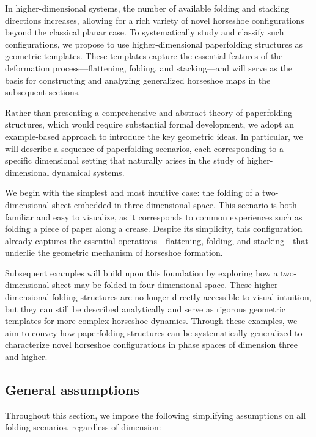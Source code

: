 \documentclass[12pt]{iopart}
\begin{document}
In higher-dimensional systems, the number of available folding and stacking directions increases, allowing for a rich variety of novel horseshoe configurations beyond the classical planar case. To systematically study and classify such configurations, we propose to use higher-dimensional paperfolding structures as geometric templates. These templates capture the essential features of the deformation process—flattening, folding, and stacking—and will serve as the basis for constructing and analyzing generalized horseshoe maps in the subsequent sections.

Rather than presenting a comprehensive and abstract theory of paperfolding structures, which would require substantial formal development, we adopt an example-based approach to introduce the key geometric ideas. In particular, we will describe a sequence of paperfolding scenarios, each corresponding to a specific dimensional setting that naturally arises in the study of higher-dimensional dynamical systems.

We begin with the simplest and most intuitive case: the folding of a two-dimensional sheet embedded in three-dimensional space. This scenario is both familiar and easy to visualize, as it corresponds to common experiences such as folding a piece of paper along a crease. Despite its simplicity, this configuration already captures the essential operations—flattening, folding, and stacking—that underlie the geometric mechanism of horseshoe formation.

Subsequent examples will build upon this foundation by exploring how a two-dimensional sheet may be folded in four-dimensional space. These higher-dimensional folding structures are no longer directly accessible to visual intuition, but they can still be described analytically and serve as rigorous geometric templates for more complex horseshoe dynamics. Through these examples, we aim to convey how paperfolding structures can be systematically generalized to characterize novel horseshoe configurations in phase spaces of dimension three and higher.

\subsection{General assumptions}

Throughout this section, we impose the following simplifying assumptions on all folding scenarios, regardless of dimension:
\end{document}
